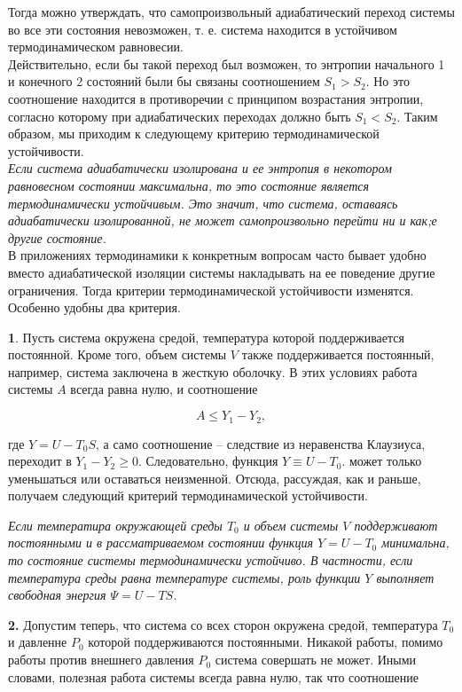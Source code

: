 \documentclass[a4paper,14pt]{article} %
\begin{document}
Тогда можно утверждать, что
самопроизвольный адиабатический переход системы во все эти состояния невозможен, т. е. система находится в устойчивом термодинамическом равновесии.\\

Действительно, если бы такой переход
был возможен, то энтропии начального 1 и конечного 2 состояний
были бы связаны соотношением $S_1 > S_2$. Но это соотношение находится в противоречии с принципом возрастания энтропии, согласно
которому при адиабатических переходах должно быть $S_1 < S_2$.
Таким образом, мы приходим к следующему критерию термодинамической устойчивости.\\

\textit{Если система адиабатически изолирована и ее энтропия в некотором равновесном состоянии максимальна, то это состояние
является термодинамически устойчивым. Это значит, что система,
оставаясь адиабатически изолированной, не может самопроизвольно
перейти ни и как;е другие состояние.}\\

В приложениях термодинамики к конкретным вопросам часто
бывает удобно вместо адиабатической изоляции системы накладывать
на ее поведение другие ограничения. Тогда критерии термодинамической устойчивости изменятся. Особенно удобны два критерия. 

\textbf{1}. Пусть система окружена средой, температура которой поддерживается постоянной. Кроме того, объем системы $V$ также поддерживается постоянный, например, система заключена в жесткую оболочку. В этих условиях работа системы $A$ всегда равна нулю, и соотношение

\begin{equation*}
A\leqslant Y_{1}-Y_{2},
\end{equation*}

где $Y = U - T_0S$, а само соотношение -- следствие из неравенства Клаузиуса, переходит в $Y_{1}-Y_{2} \geqslant 0 .$ Следовательно, функция $Y \equiv U-T_{0}$. может только уменьшаться или оставаться неизменной. Отсюда, рассуждая, как и раньше, получаем следующий критерий термодинамической устойчивости.

\textit{Если температира окружающей среды $T_{0}$ и объем системы $V$ поддерживают постоянными и в рассматриваемом состоянии функция $Y=U-T_{0}$ минимальна, то состояние системы термодинамически устойчиво. В частности, если температура среды равна температуре системы, роль функции $Y$ выполняет свободная энергия $\Psi=U - T S$.}

\textbf{2.} Допустим теперь, что система со всех сторон окружена средой, температура $T_{0}$ и давленне $P_{0}$ которой поддерживаются постоянными. Никакой работы, помимо работы против внешнего давления $P_{0}$ система совершать не может. Иными словами, полезная работа системы всегда равна нулю, так что соотношение 
\end{document}
